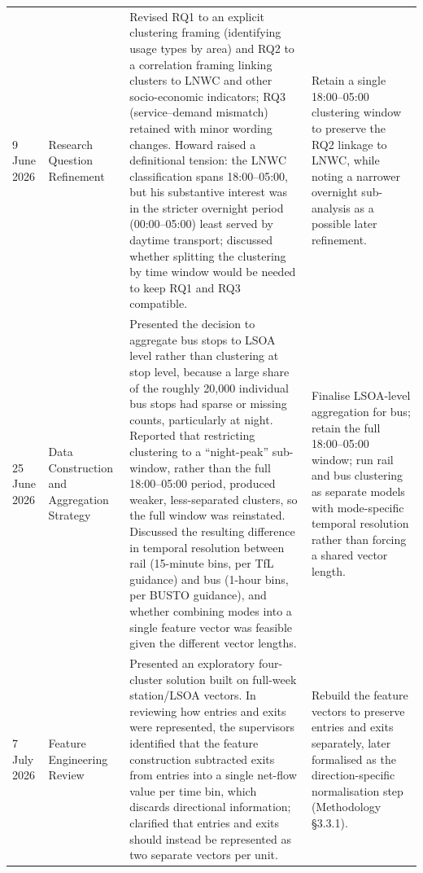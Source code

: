 \begin{landscape}
\begin{longtable}{@{}p{2.4cm} p{4.0cm} p{8.0cm} p{6.6cm}@{}}
9 June 2026 & Research Question Refinement & Revised RQ1 to an explicit clustering framing (identifying usage types by area) and RQ2 to a correlation framing linking clusters to LNWC and other socio-economic indicators; RQ3 (service--demand mismatch) retained with minor wording changes. Howard raised a definitional tension: the LNWC classification spans 18:00--05:00, but his substantive interest was in the stricter overnight period (00:00--05:00) least served by daytime transport; discussed whether splitting the clustering by time window would be needed to keep RQ1 and RQ3 compatible. & Retain a single 18:00--05:00 clustering window to preserve the RQ2 linkage to LNWC, while noting a narrower overnight sub-analysis as a possible later refinement. \\
25 June 2026 & Data Construction and Aggregation Strategy & Presented the decision to aggregate bus stops to LSOA level rather than clustering at stop level, because a large share of the roughly 20,000 individual bus stops had sparse or missing counts, particularly at night. Reported that restricting clustering to a ``night-peak'' sub-window, rather than the full 18:00--05:00 period, produced weaker, less-separated clusters, so the full window was reinstated. Discussed the resulting difference in temporal resolution between rail (15-minute bins, per TfL guidance) and bus (1-hour bins, per BUSTO guidance), and whether combining modes into a single feature vector was feasible given the different vector lengths. & Finalise LSOA-level aggregation for bus; retain the full 18:00--05:00 window; run rail and bus clustering as separate models with mode-specific temporal resolution rather than forcing a shared vector length. \\
7 July 2026 & Feature Engineering Review & Presented an exploratory four-cluster solution built on full-week station/LSOA vectors. In reviewing how entries and exits were represented, the supervisors identified that the feature construction subtracted exits from entries into a single net-flow value per time bin, which discards directional information; clarified that entries and exits should instead be represented as two separate vectors per unit. & Rebuild the feature vectors to preserve entries and exits separately, later formalised as the direction-specific normalisation step (Methodology \S 3.3.1). \\

\end{longtable}
\end{landscape}
